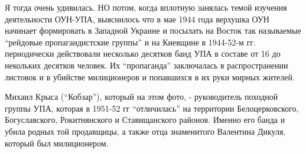 Я тогда очень удивилась. НО потом, когда вплотную занялась темой изучения
деятельности ОУН-УПА, выяснилось что в  мае 1944 года верхушка ОУН начинает
формировать в Западной Украине и посылать на Восток так называемые \enquote{рейдовые
пропагандистские группы} и на Киевщине в 1944-52-м гг. периодически действовали
несколько десятков банд УПА в составе от 16 до некольких десятков человек. Их
\enquote{пропаганда} заключалась в распространении листовок и в убийстве милиционеров и
попавшихся в их руки мирных жителей. 

Михаил Крыса (\enquote{Кобзар}), который на этом фото, - руководитель походной
группы УПА, которая в 1951-52 гг \enquote{отличилась} на территории Белоцерковского,
Богуславского, Рокитнянского и Ставищанского районов. Именно его банда и убила
родных той продавщицы, а также отца знаменитого Валентина Дикуля, который был
милиционером.
